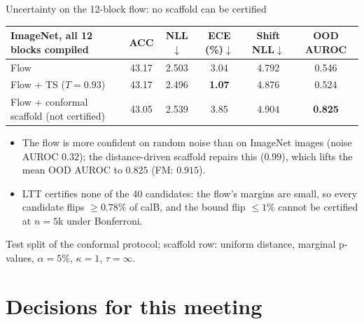 \documentclass[aspectratio=169,11pt]{beamer}
\newcommand{\source}[1]{\par\vfill{\scriptsize\color{inkgrey}#1}}
\begin{document}
\begin{frame}{Uncertainty on the 12-block flow: no scaffold can be certified}
  \small
  \centering
  \begin{tabular}{@{}lccccc@{}}
    \toprule
    ImageNet, all 12 blocks compiled & ACC & NLL$\downarrow$ & ECE (\%)$\downarrow$ & Shift NLL$\downarrow$ & OOD AUROC\\
    \midrule
    Flow & 43.17 & 2.503 & 3.04 & 4.792 & 0.546\\
    Flow + TS ($T=0.93$) & 43.17 & 2.496 & \textbf{1.07} & 4.876 & 0.524\\
    Flow + conformal scaffold (not certified) & 43.05 & 2.539 & 3.85 & 4.904 & \textbf{0.825}\\
    \bottomrule
  \end{tabular}
  \par\smallskip\raggedright
  \begin{itemize}
    \item The flow is more confident on random noise than on ImageNet images (noise AUROC $0.32$); the distance-driven scaffold repairs this ($0.99$), which lifts the mean OOD AUROC to $0.825$ (FM: $0.915$).
    \item LTT certifies none of the 40 candidates: the flow's margins are small, so every candidate flips $\ge0.78\%$ of calB, and the bound flip $\le1\%$ cannot be certified at $n=5$k under Bonferroni.
  \end{itemize}
  \source{Test split of the conformal protocol; scaffold row: uniform distance, marginal p-values, $\alpha=5\%$, $\kappa=1$, $\tau=\infty$.}
\end{frame}

\section{Decisions for this meeting}
\end{document}
